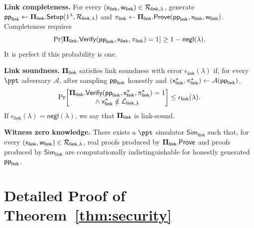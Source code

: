 \noindent\textbf{Link completeness.}
For every
\((\mathsf{x}_{\mathsf{link}},\mathsf{w}_{\mathsf{link}})
\in{\mathcal{R}}_{\mathsf{link},\lambda}\), generate
\(\textsf{pp}_{\mathsf{link}}\gets
{\bf \Pi}_{\mathsf{link}}.{\sf Setup}(1^\lambda,{\mathcal{R}}_{\mathsf{link},\lambda})\) and
\(\pi_{\mathsf{link}}\gets{\bf \Pi}_{\mathsf{link}}.{\sf Prove}(
\textsf{pp}_{\mathsf{link}},\mathsf{x}_{\mathsf{link}},\mathsf{w}_{\mathsf{link}})\).
Completeness requires
\[
\Pr\!\left[
  {\bf \Pi}_{\mathsf{link}}.{\sf Verify}(
    \textsf{pp}_{\mathsf{link}},\mathsf{x}_{\mathsf{link}},\pi_{\mathsf{link}})=1
\right]
\ge 1-\textsf{negl}(\lambda).
\]
It is perfect if this probability is one.

\noindent\textbf{Link soundness.}
\({\bf \Pi}_{\mathsf{link}}\) satisfies link soundness with error
\(\epsilon_{\mathsf{link}}(\lambda)\) if, for every \(\ppt\) adversary
\(\mathcal{A}\), after sampling \(\textsf{pp}_{\mathsf{link}}\) honestly and
\((\mathsf{x}_{\mathsf{link}}^\star,\pi_{\mathsf{link}}^\star)
\gets\mathcal A(\textsf{pp}_{\mathsf{link}})\),
\[
\Pr\!\left[
\begin{gathered}
  {\bf \Pi}_{\mathsf{link}}.{\sf Verify}(
    \textsf{pp}_{\mathsf{link}},\mathsf{x}_{\mathsf{link}}^\star,
    \pi_{\mathsf{link}}^\star)=1\\[-1mm]
  \wedge\;
  \mathsf{x}_{\mathsf{link}}^\star\notin\mathcal{L}_{\mathsf{link},\lambda}
\end{gathered}
\right]
\le \epsilon_{\mathsf{link}}(\lambda).
\]
If \(\epsilon_{\mathsf{link}}(\lambda)=\textsf{negl}(\lambda)\), we say that
\({\bf \Pi}_{\mathsf{link}}\) is link-sound.

\noindent\textbf{Witness zero knowledge.}
There exists a \(\ppt\) simulator \(\mathsf{Sim}_{\mathsf{link}}\) such that,
for every
\((\mathsf{x}_{\mathsf{link}},\mathsf{w}_{\mathsf{link}})
\in{\mathcal{R}}_{\mathsf{link},\lambda}\), real proofs produced by
\({\bf \Pi}_{\mathsf{link}}.{\sf Prove}\) and proofs produced by
\(\mathsf{Sim}_{\mathsf{link}}\) are computationally indistinguishable for
honestly generated \(\textsf{pp}_{\mathsf{link}}\).

\section{Detailed Proof of Theorem~\ref{thm:security}}
\label{app:security-proof}

